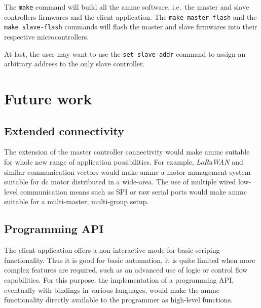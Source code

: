 The \texttt{make} command will build all the ammc software, i.e.\ the master
and slave controllers firmwares and the client application. The \texttt{make
master-flash} and the \texttt{make slave-flash} commands will flash the master
and slave firmwares into their respective microcontrollers.

At last, the user may want to use the \texttt{set-slave-addr} command to assign
an arbitrary address to the only slave controller.

\section{Future work}

\subsection{Extended connectivity}
The extension of the master controller connectivity would make ammc suitable
for whole new range of application possibilities. For example, \emph{LoRaWAN}
and similar communication vectors would make ammc a motor management system
suitable for dc motor distributed in a wide-area. The use of multiple wired
low-level communication means such as SPI or raw serial ports would make ammc
suitable for a multi-master, multi-group setup.

\subsection{Programming API}
The client application offers a non-interactive mode for basic scriping
functionality. Thus it is good for basic automation, it is quite limited when
more complex features are required, such as an advanced use of logic or control
flow capabilities. For this purpose, the implementation of a programming API,
eventually with bindings in various languages, would make the ammc
functionality directly available to the programmer as high-level functions.
